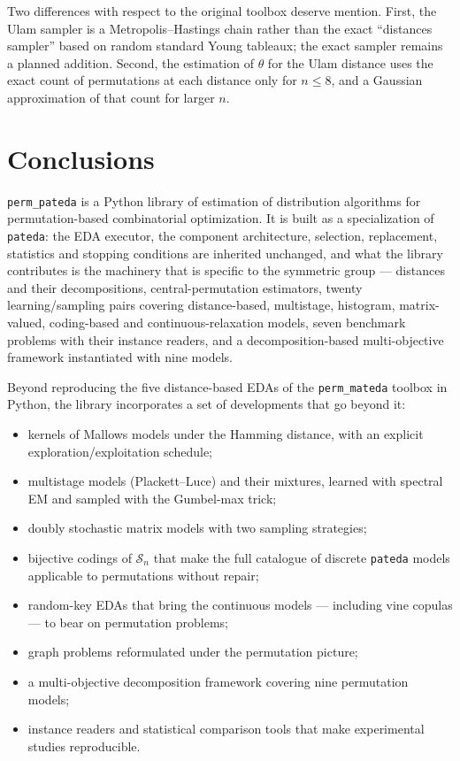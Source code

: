 \documentclass[a4paper,11pt]{article}
\begin{document}
Two differences with respect to the original toolbox deserve mention.  First,
the Ulam sampler is a Metropolis--Hastings chain rather than the exact
``distances sampler'' based on random standard Young tableaux; the exact sampler
remains a planned addition.  Second, the estimation of $\theta$ for the Ulam
distance uses the exact count of permutations at each distance only for
$n \leq 8$, and a Gaussian approximation of that count for larger $n$.

\section{Conclusions}

\texttt{perm\_pateda} is a Python library of estimation of distribution
algorithms for permutation-based combinatorial optimization.  It is built as a
specialization of \texttt{pateda}: the EDA executor, the component architecture,
selection, replacement, statistics and stopping conditions are inherited
unchanged, and what the library contributes is the machinery that is specific to
the symmetric group --- distances and their decompositions, central-permutation
estimators, twenty learning/sampling pairs covering distance-based,
multistage, histogram, matrix-valued, coding-based and continuous-relaxation
models, seven benchmark problems with their instance readers, and a
decomposition-based multi-objective framework instantiated with nine models.

Beyond reproducing the five distance-based EDAs of the \texttt{perm\_mateda}
toolbox in Python, the library incorporates a set of developments that go beyond
it:

\begin{itemize}
  \item kernels of Mallows models under the Hamming distance, with an explicit
    exploration/exploitation schedule;
  \item multistage models (Plackett--Luce) and their mixtures, learned with
    spectral EM and sampled with the Gumbel-max trick;
  \item doubly stochastic matrix models with two sampling strategies;
  \item bijective codings of $\mathcal{S}_n$ that make the full catalogue of
    discrete \texttt{pateda} models applicable to permutations without repair;
  \item random-key EDAs that bring the continuous models --- including vine
    copulas --- to bear on permutation problems;
  \item graph problems reformulated under the permutation picture;
  \item a multi-objective decomposition framework covering nine permutation
    models;
  \item instance readers and statistical comparison tools that make experimental
    studies reproducible.
\end{itemize}
\end{document}
